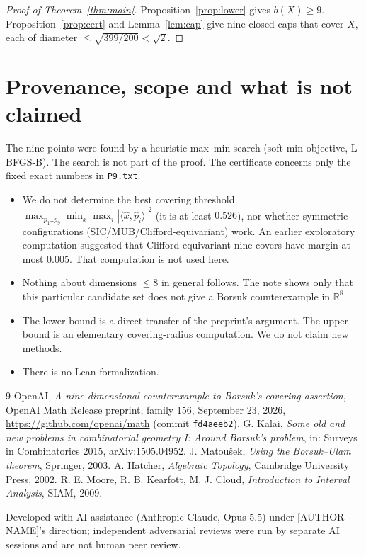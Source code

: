 \documentclass[11pt]{amsart}
\theoremstyle{remark}
\newcommand{\R}{\mathbb R}
\begin{document}
\begin{proof}[Proof of Theorem~\ref{thm:main}]
Proposition~\ref{prop:lower} gives $b(X)\ge9$. Proposition~\ref{prop:cert} and
Lemma~\ref{lem:cap} give nine closed caps that cover $X$, each of diameter
$\le\sqrt{399/200}<\sqrt2$.
\end{proof}

\section{Provenance, scope and what is not claimed}
The nine points were found by a heuristic max--min search (soft-min objective,
L-BFGS-B). The search is not part of the proof. The certificate concerns only the
fixed exact numbers in \texttt{P9.txt}.

\begin{itemize}
\item We do not determine the best covering threshold
$\max_{p_1..p_9}\min_x\max_i|\langle\hat x,\hat p_i\rangle|^2$ (it is at least $0.526$),
nor whether symmetric configurations (SIC/MUB/Clifford-equivariant) work. An earlier
exploratory computation suggested that Clifford-equivariant nine-covers have
margin at most $0.005$. That computation is not used here.
\item Nothing about dimensions $\le 8$ in general follows. The note shows only that this
particular candidate set does not give a Borsuk counterexample in $\R^8$.
\item The lower bound is a direct transfer of the preprint's argument. The upper
bound is an elementary covering-radius computation. We do not claim new
methods.
\item There is no Lean formalization.
\end{itemize}

\begin{thebibliography}{9}
 OpenAI, \emph{A nine-dimensional counterexample to Borsuk's covering assertion},
OpenAI Math Release preprint, family 156, September 23, 2026,
\url{https://github.com/openai/math} (commit \texttt{fd4aeeb2}).
 G. Kalai, \emph{Some old and new problems in combinatorial geometry I: Around Borsuk's problem},
in: Surveys in Combinatorics 2015, arXiv:1505.04952.
 J. Matou\v{s}ek, \emph{Using the Borsuk--Ulam theorem}, Springer, 2003.
 A. Hatcher, \emph{Algebraic Topology}, Cambridge University Press, 2002.
 R. E. Moore, R. B. Kearfott, M. J. Cloud, \emph{Introduction to Interval Analysis}, SIAM, 2009.
\end{thebibliography}

\bigskip\noindent\small Developed with AI assistance (Anthropic Claude, Opus 5.5) under
[AUTHOR NAME]'s direction; independent adversarial reviews were run by separate AI
sessions and are not human peer review.
\end{document}
